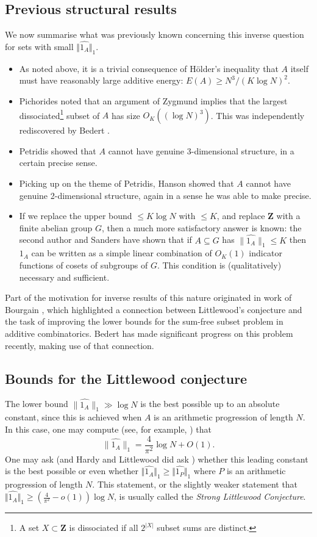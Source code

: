\documentclass[reqno]{amsart}
\newcommand{\anorm}[1]{\| \widehat{#1}\|}
\renewcommand{\leq}{\leqslant}
\renewcommand{\geq}{\geqslant}
\newcommand{\ind}[1]{1_{#1}}
\newcommand{\bbz}{\mathbf{Z}}
\newcommand{\abs}[1]{\left\lvert #1\right\rvert}
\numberwithin{equation}{section}
\theoremstyle{definition}
\theoremstyle{remark}
\begin{document}
\subsection{Previous structural results}
We now summarise what was previously known concerning this inverse question for sets with small $\Vert \widehat{1_A} \Vert_1$. 
\begin{itemize}
\item As noted above, it is a trivial consequence of H\"{o}lder's inequality that $A$ itself must have reasonably large additive energy: $E(A)\geq N^3/(K\log N)^2$. 
\item Pichorides \cite[Lemma 3]{Pi80} noted that an argument of Zygmund \cite[Chapter XII, 7.6]{Zy02} implies that the largest dissociated\footnote{A set $X\subset \bbz$ is dissociated if all $2^{\abs{X}}$ subset sums are distinct.} subset of $A$ has size $O_K((\log N)^3)$. This was independently rediscovered by Bedert \cite{Be25}. 
\item Petridis \cite{Pe13} showed that $A$ cannot have genuine 3-dimensional structure, in a certain precise sense.
\item Picking up on the theme of Petridis, Hanson \cite{Ha21} showed that $A$ cannot have genuine 2-dimensional structure, again in a sense he was able to make precise.
\item If we replace the upper bound $\leq K\log N$ with $\leq K$, and replace $\bbz$ with a finite abelian group $G$, then a much more satisfactory answer is known: the second author and Sanders \cite{GrSa08} have shown that if $A\subseteq G$ has $\anorm{\ind{A}}_1\leq K$ then $\ind{A}$ can be written as a simple linear combination of $O_K(1)$ indicator functions of cosets of subgroups of $G$. This condition is (qualitatively) necessary and sufficient.
\end{itemize}
Part of the motivation for inverse results of this nature originated in work of Bourgain \cite{Bo97}, which highlighted a connection between Littlewood's conjecture and the task of improving the lower bounds for the sum-free subset problem in additive combinatorics. Bedert \cite{Be25} has made significant progress on this problem recently, making use of that connection.

\subsection{Bounds for the Littlewood conjecture}
The lower bound $\anorm{1_A}_1\gg \log N$ is the best possible up to an absolute constant, since this is achieved when $A$ is an arithmetic progression of length $N$. In this case, one may compute (see, for example, \cite[II.12.1]{Zy02}) that
\[\anorm{1_A}_1=\frac{4}{\pi^2}\log N+O(1).\]
One may ask (and Hardy and Littlewood did ask \cite[p 167]{HaLi48}) whether this leading constant is the best possible or even whether $\Vert \widehat{1_A} \Vert_1 \geq \Vert \widehat{1_P} \Vert_1$ where $P$ is an arithmetic progression of length $N$. This statement, or the slightly weaker statement that $\Vert \widehat{1_A} \Vert_1 \geq (\frac{4}{\pi^2} - o(1)) \log N$, is usually called the \emph{Strong Littlewood Conjecture}.
\end{document}
